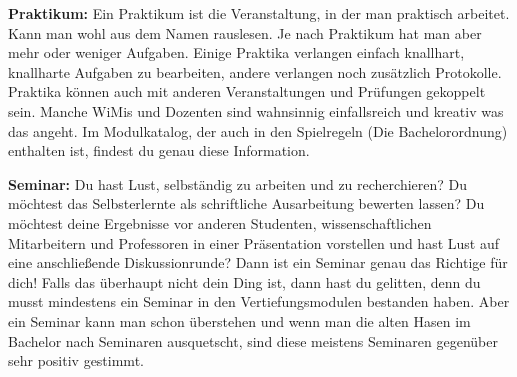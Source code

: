 \textbf{Praktikum: }
Ein Praktikum ist die Veranstaltung, in der man praktisch arbeitet. Kann man wohl aus dem Namen rauslesen. Je nach Praktikum hat man aber mehr oder weniger Aufgaben. Einige Praktika verlangen einfach knallhart, knallharte Aufgaben zu bearbeiten, andere verlangen noch zusätzlich Protokolle. Praktika können auch mit anderen Veranstaltungen und Prüfungen gekoppelt sein. Manche WiMis und Dozenten sind wahnsinnig einfallsreich und kreativ was das angeht. Im Modulkatalog, der auch in den Spielregeln (Die Bachelorordnung) enthalten ist, findest du genau diese Information. 

\textbf{Seminar: }
Du hast Lust, selbständig zu arbeiten und zu recherchieren? Du möchtest das Selbsterlernte als schriftliche Ausarbeitung bewerten lassen? Du möchtest deine Ergebnisse vor anderen Studenten, wissenschaftlichen Mitarbeitern und Professoren in einer Präsentation vorstellen und hast Lust auf eine anschließende Diskussionrunde? Dann ist ein Seminar genau das Richtige für dich! Falls das überhaupt nicht dein Ding ist, dann hast du gelitten, denn du musst mindestens ein Seminar in den Vertiefungsmodulen bestanden haben. Aber ein Seminar kann man schon überstehen und wenn man die alten Hasen im Bachelor nach Seminaren ausquetscht, sind diese meistens Seminaren gegenüber sehr positiv gestimmt.
\spaltenende
